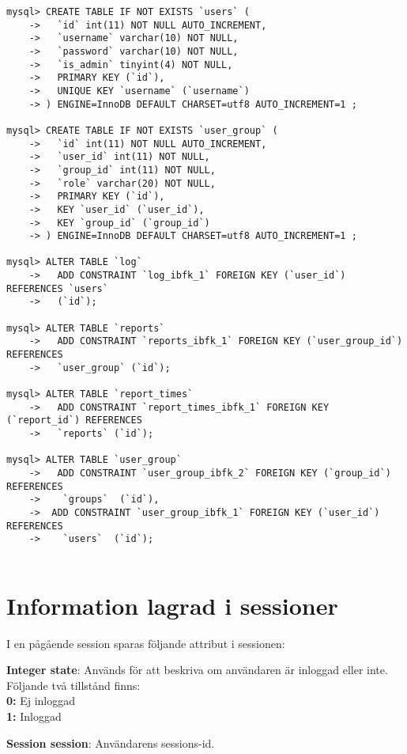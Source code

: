 \documentclass[a4paper]{article}
\begin{document}
\begin{lstlisting}
mysql> CREATE TABLE IF NOT EXISTS `users` (
    ->   `id` int(11) NOT NULL AUTO_INCREMENT,
    ->   `username` varchar(10) NOT NULL,
    ->   `password` varchar(10) NOT NULL,
    ->   `is_admin` tinyint(4) NOT NULL,
    ->   PRIMARY KEY (`id`),
    ->   UNIQUE KEY `username` (`username`)
    -> ) ENGINE=InnoDB DEFAULT CHARSET=utf8 AUTO_INCREMENT=1 ;
    
mysql> CREATE TABLE IF NOT EXISTS `user_group` (
    ->   `id` int(11) NOT NULL AUTO_INCREMENT,
    ->   `user_id` int(11) NOT NULL,
    ->   `group_id` int(11) NOT NULL,
    ->   `role` varchar(20) NOT NULL,
    ->   PRIMARY KEY (`id`),
    ->   KEY `user_id` (`user_id`),
    ->   KEY `group_id` (`group_id`)
    -> ) ENGINE=InnoDB DEFAULT CHARSET=utf8 AUTO_INCREMENT=1 ;
    
mysql> ALTER TABLE `log`
    ->   ADD CONSTRAINT `log_ibfk_1` FOREIGN KEY (`user_id`) REFERENCES `users`
    ->   (`id`);

mysql> ALTER TABLE `reports`
    ->   ADD CONSTRAINT `reports_ibfk_1` FOREIGN KEY (`user_group_id`) REFERENCES
    ->   `user_group` (`id`);

mysql> ALTER TABLE `report_times`
    ->   ADD CONSTRAINT `report_times_ibfk_1` FOREIGN KEY (`report_id`) REFERENCES
    ->   `reports` (`id`);

mysql> ALTER TABLE `user_group`
    ->   ADD CONSTRAINT `user_group_ibfk_2` FOREIGN KEY (`group_id`) REFERENCES
    ->    `groups`  (`id`),
    ->  ADD CONSTRAINT `user_group_ibfk_1` FOREIGN KEY (`user_id`) REFERENCES
    ->    `users`  (`id`);
  
\end{lstlisting}


\section{Information lagrad i sessioner}
I en pågående session sparas följande attribut i sessionen:

\vspace{5mm}
\begin{hangparas}{1.5em}{1}
\textbf{Integer state}: Används för att beskriva om användaren är inloggad eller inte. Följande två tillstånd finns:\\
\textbf{0:} Ej inloggad\\
\textbf{1:} Inloggad
\end{hangparas}

\vspace{5mm}
\begin{hangparas}{1.5em}{1}
\textbf{Session session}: Användarens sessions-id.
\end{hangparas}
\end{document}

